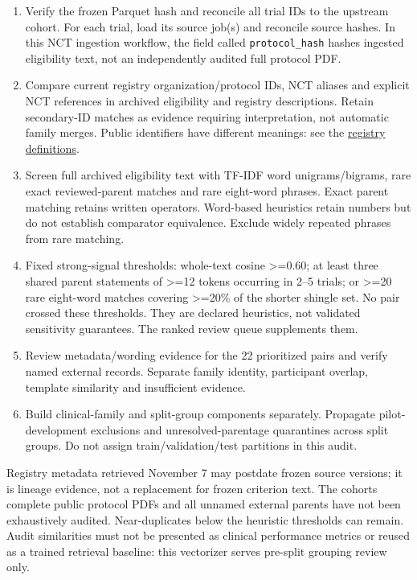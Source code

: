 \documentclass[10pt,letterpaper]{article}
\newcommand{\pathcode}[1]{\nolinkurl{#1}}
\begin{document}
\begin{enumerate}
\def\labelenumi{\arabic{enumi}.}
\item
  Verify the frozen Parquet hash and reconcile all trial IDs to the upstream cohort. For each trial, load its source job(s) and reconcile source hashes. In this NCT ingestion workflow, the field called \pathcode{protocol_hash} hashes ingested eligibility text, not an independently audited full protocol PDF.
\item
  Compare current registry organization/protocol IDs, NCT aliases and explicit NCT references in archived eligibility and registry descriptions. Retain secondary-ID matches as evidence requiring interpretation, not automatic family merges. Public identifiers have different meanings: see the \href{https://clinicaltrials.gov/policy/protocol-definitions}{registry definitions}.
\item
  Screen full archived eligibility text with TF-IDF word unigrams/bigrams, rare exact reviewed-parent matches and rare eight-word phrases. Exact parent matching retains written operators. Word-based heuristics retain numbers but do not establish comparator equivalence. Exclude widely repeated phrases from rare matching.
\item
  Fixed strong-signal thresholds: whole-text cosine \textgreater=0.60; at least three shared parent statements of \textgreater=12 tokens occurring in 2--5 trials; or \textgreater=20 rare eight-word matches covering \textgreater=20\% of the shorter shingle set. No pair crossed these thresholds. They are declared heuristics, not validated sensitivity guarantees. The ranked review queue supplements them.
\item
  Review metadata/wording evidence for the 22 prioritized pairs and verify named external records. Separate family identity, participant overlap, template similarity and insufficient evidence.
\item
  Build clinical-family and split-group components separately. Propagate pilot-development exclusions and unresolved-parentage quarantines across split groups. Do not assign train/validation/test partitions in this audit.
\end{enumerate}

Registry metadata retrieved November 7 may postdate frozen source versions; it is lineage evidence, not a replacement for frozen criterion text. The cohort\textquotesingle s complete public protocol PDFs and all unnamed external parents have not been exhaustively audited. Near-duplicates below the heuristic thresholds can remain. Audit similarities must not be presented as clinical performance metrics or reused as a trained retrieval baseline: this vectorizer serves pre-split grouping review only.
\end{document}
